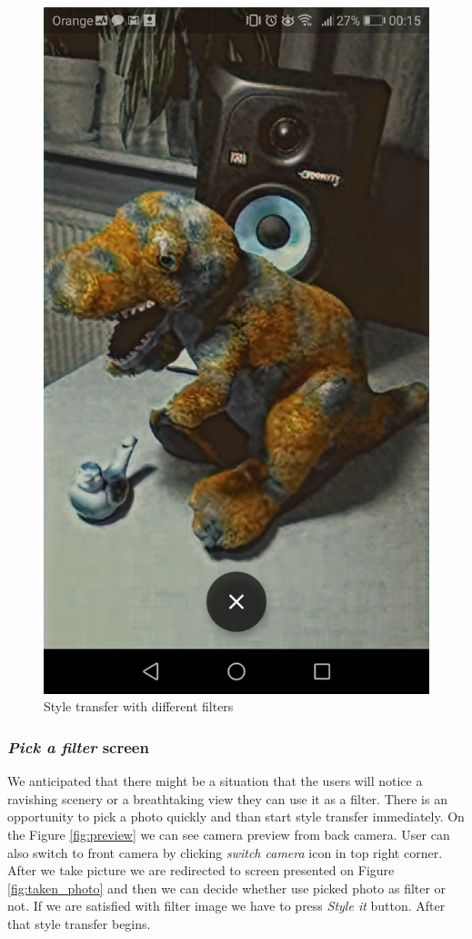 \documentclass[../Main.tex]{subfiles}
\begin{document}
\begin{figure}[H]
        \includegraphics[width=\linewidth]{Chapters/dino3.jpg}
    \endminipage\hfill
    \caption{Style transfer with different filters}\label{fig:gallery_options}
\end{figure}


\subsubsection{\textit{Pick a filter} screen}
We anticipated that there might be a situation that the users will notice a ravishing 
scenery or a breathtaking view they can use it as a filter.
There is an opportunity to pick a photo quickly and than start style transfer immediately.
On the Figure \ref{fig:preview} we can see camera preview from back camera.
User can also switch to front camera by clicking \textit{switch camera}
icon in top right corner.
After we take picture we are redirected to screen presented on Figure 
\ref{fig:taken_photo} and then we can decide whether use picked photo as filter or not.
If we are satisfied with filter image we have to press \textit{Style it} button.
After that style transfer begins.
\end{document}
